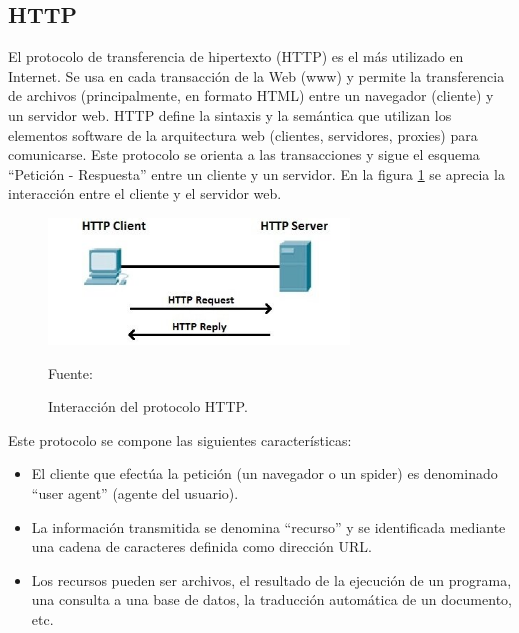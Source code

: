 \subsection{HTTP}
El protocolo de transferencia de hipertexto (HTTP) es el más utilizado en Internet. Se usa en cada transacción de la Web (www) y permite la transferencia de archivos (principalmente, en formato HTML) entre un navegador (cliente) y un servidor web. HTTP define la sintaxis y la semántica que utilizan los elementos software de la arquitectura web (clientes, servidores, proxies) para comunicarse. Este protocolo se orienta a las transacciones y sigue el esquema ``Petición - Respuesta'' entre un cliente y un servidor. En la figura \ref{fig:http} se aprecia la interacción entre el cliente y el servidor web.\\

\begin{figure}[H]
    \begin{center}
        \includegraphics[width=8cm]{img/capitulo_2/http1.jpg}
    \end{center}
    \begin{center}
        \caption{Interacción del protocolo HTTP.}
        Fuente: \cite{http}
        \label{fig:http}
    \end{center}
\end{figure}

Este protocolo se compone las siguientes características:
\begin{itemize}
    \item El cliente que efectúa la petición (un navegador o un spider) es denominado ``user agent'' (agente del usuario). 
    \item La información transmitida se denomina ``recurso'' y se identificada mediante una cadena de caracteres definida como dirección URL.
    \item Los recursos pueden ser archivos, el resultado de la ejecución de un programa, una consulta a una base de datos, la traducción automática de un documento, etc.
\end{itemize}

